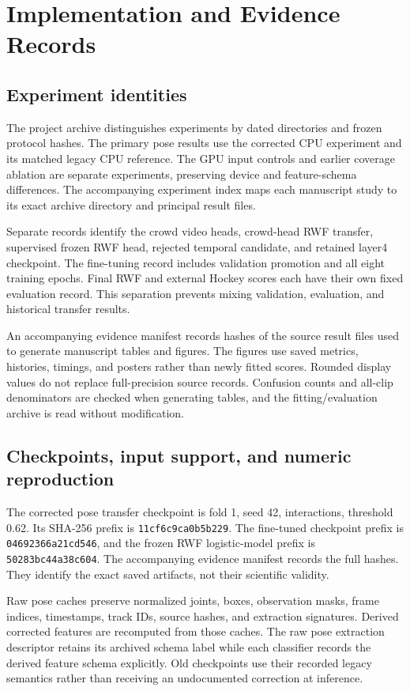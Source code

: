 \section{Implementation and Evidence Records}
\subsection{Experiment identities}
The project archive distinguishes experiments by dated directories and frozen protocol hashes. The primary pose results use the corrected CPU experiment and its matched legacy CPU reference. The GPU input controls and earlier coverage ablation are separate experiments, preserving device and feature-schema differences. The accompanying experiment index maps each manuscript study to its exact archive directory and principal result files.

Separate records identify the crowd video heads, crowd-head RWF transfer, supervised frozen RWF head, rejected temporal candidate, and retained layer4 checkpoint. The fine-tuning record includes validation promotion and all eight training epochs. Final RWF and external Hockey scores each have their own fixed evaluation record. This separation prevents mixing validation, evaluation, and historical transfer results.

An accompanying evidence manifest records hashes of the source result files used to generate manuscript tables and figures. The figures use saved metrics, histories, timings, and posters rather than newly fitted scores. Rounded display values do not replace full-precision source records. Confusion counts and all-clip denominators are checked when generating tables, and the fitting/evaluation archive is read without modification.

\subsection{Checkpoints, input support, and numeric reproduction}
The corrected pose transfer checkpoint is fold 1, seed 42, interactions, threshold 0.62. Its SHA-256 prefix is \texttt{11cf6c9ca0b5b229}. The fine-tuned checkpoint prefix is \texttt{04692366a21cd546}, and the frozen RWF logistic-model prefix is \texttt{50283bc44a38c604}. The accompanying evidence manifest records the full hashes. They identify the exact saved artifacts, not their scientific validity.

Raw pose caches preserve normalized joints, boxes, observation masks, frame indices, timestamps, track IDs, source hashes, and extraction signatures. Derived corrected features are recomputed from those caches. The raw pose extraction descriptor retains its archived schema label while each classifier records the derived feature schema explicitly. Old checkpoints use their recorded legacy semantics rather than receiving an undocumented correction at inference.

